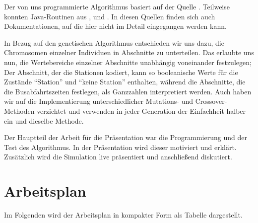 \documentclass[a4paper, 11pt]{scrartcl}
\begin{document}
Der von uns programmierte Algorithmus basiert auf der Quelle \cite{gerdes2004}. Teilweise konnten Java-Routinen aus \cite{gerdes2004}, \cite{jacobson2015} und \cite{selzam2006}. In diesen Quellen finden sich auch Dokumentationen, auf die hier nicht im Detail eingegangen werden kann.

In Bezug auf den genetischen Algorithmus entschieden wir uns dazu, die Chromosomen einzelner Individuen in Abschnitte zu unterteilen. Das erlaubte uns nun, die Wertebereiche einzelner Abschnitte unabhängig voneinander festzulegen; Der Abschnitt, der die Stationen kodiert, kann so booleanische Werte für die Zustände "`Station"' und "`keine Station"' enthalten, während die Abschnitte, die die Busabfahrtszeiten festlegen, als Ganzzahlen interpretiert werden. Auch haben wir auf die Implementierung unterschiedlicher Mutations- und Crossover-Methoden \cite{gerdes2004} verzichtet und verwenden in jeder Generation der Einfachheit halber ein und dieselbe Methode.

Der Hauptteil der Arbeit für die Präsentation war die Programmierung und der Test des Algorithmus. In der Präsentation wird dieser motiviert und erklärt. Zusätzlich wird die Simulation live präsentiert und anschließend diskutiert.



\newpage
\section{Arbeitsplan}

Im Folgenden wird der Arbeitsplan in kompakter Form als Tabelle dargestellt.
\end{document}
